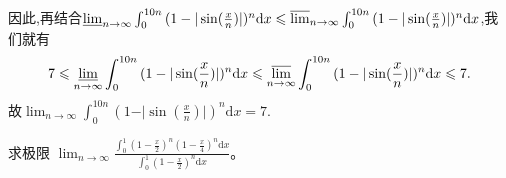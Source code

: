 \documentclass[../../main.tex]{subfiles}
\begin{document}
\begin{solution}
因此,再结合\(\varliminf_{n\rightarrow\infty}\int_0^{10n}{(1-\vert\sin(\frac{x}{n})\vert)^n}\mathrm{d}x\leqslant\varlimsup_{n\rightarrow\infty}\int_0^{10n}{(1-\vert\sin(\frac{x}{n})\vert)^n}\mathrm{d}x\),我们就有
\[
7\leqslant\varliminf_{n\rightarrow\infty}\int_0^{10n}{(1-\vert\sin(\frac{x}{n})\vert)^n}\mathrm{d}x\leqslant\varlimsup_{n\rightarrow\infty}\int_0^{10n}{(1-\vert\sin(\frac{x}{n})\vert)^n}\mathrm{d}x\leqslant 7.
\]
故\(\lim_{n\rightarrow\infty}\int_0^{10n}{(1-\vert\sin(\frac{x}{n})\vert)^n}\mathrm{d}x = 7\).

\end{solution}

\begin{example}
求极限 $\lim_{n\rightarrow \infty} \frac{\int_0^1{\left( 1-\frac{x}{2} \right) ^n\left( 1-\frac{x}{4} \right) ^n\mathrm{d}x}}{\int_0^1{\left( 1-\frac{x}{2} \right) ^n\mathrm{d}x}}$。
\end{example}
\end{document}
